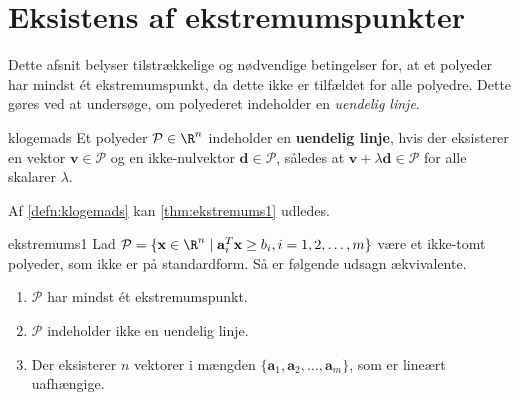 \section{Eksistens af ekstremumspunkter}
%
Dette afsnit belyser tilstrækkelige og nødvendige betingelser for, at et polyeder har mindst ét ekstremumspunkt, da dette ikke er tilfældet for alle polyedre. 
Dette gøres ved at undersøge, om polyederet indeholder en \textit{uendelig linje}.
%
\begin{defn}{}{klogemads}
Et polyeder $\mathcal{P} \in \R^n$ indeholder en \textbf{uendelig linje}, hvis der eksisterer en vektor $\textbf{v} \in \mathcal{P}$ og en ikke-nulvektor $\textbf{d} \in \mathcal{P}$, således at $\textbf{v} + \lambda \textbf{d} \in \mathcal{P}$ for alle skalarer $\lambda$.
\end{defn}
\noindent
%
Af \ref{defn:klogemads} kan \ref{thm:ekstremums1} udledes.
%
\begin{thm}{}{ekstremums1}
Lad $\mathcal{P} = \{\textbf{x} \in \R^n \mid \textbf{a}_i^T\textbf{x} \geq b_i, i = 1,2,\ldots,m  \}$ være et ikke-tomt polyeder, som ikke er på standardform.
Så er følgende udsagn ækvivalente.
%
\begin{enumerate}[label = (\alph*)]
\item $\mathcal{P}$ har mindst ét ekstremumspunkt.
\item $\mathcal{P}$ indeholder ikke en uendelig linje.
\item Der eksisterer $n$ vektorer i mængden $\{\mathbf{a}_1, \mathbf{a}_2, \ldots , \mathbf{a}_m \}$, som er lineært uafhængige.
\end{enumerate}
\end{thm}
%
\newpage
%
